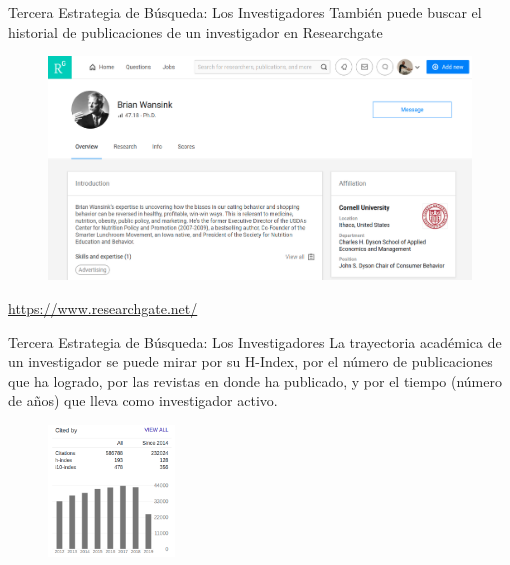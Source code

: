 \documentclass[9pt]{beamer}
\begin{document}
\begin{frame}{Tercera Estrategia de Búsqueda: Los Investigadores}
También puede buscar el historial de publicaciones de un investigador en Researchgate
\begin{figure}
\centering
 \includegraphics[width=1\textwidth]{b10}
\end{figure}
\color{blue!46!green}
\url{https://www.researchgate.net/}
\end{frame}

\begin{frame}{Tercera Estrategia de Búsqueda: Los Investigadores}
La trayectoria académica de un investigador se puede mirar por su H-Index, por el número de publicaciones que ha logrado, por las revistas en donde ha publicado, y por el tiempo (número de años) que lleva como investigador activo.
\begin{figure}
\centering
 \includegraphics[width=0.3\textwidth]{b12}
\end{figure}
\end{frame}
\end{document}
